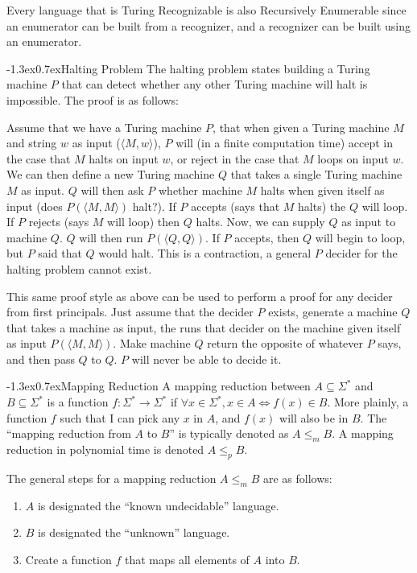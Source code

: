 \documentclass[10pt,landscape]{article}
\makeatletter
\renewcommand{\subsection}{\@startsection{subsection}{2}{0pt}%
                           {-1.3ex}{0.7ex}{\normalfont\normalsize\bfseries}}
\makeatother
\begin{document}
\begin{multicols*}{3}
Every language that is Turing Recognizable is also Recursively Enumerable since
an enumerator can be built from a recognizer, and a recognizer can be built
using an enumerator.

\subsection{Halting Problem}
The halting problem states building a Turing machine $P$ that can detect
whether any other Turing machine will halt is impossible. The proof is as
follows:

Assume that we have a Turing machine $P$, that when given a Turing machine
$M$ and string $w$ as input ($\langle M, w \rangle$), $P$ will (in a finite
computation time) accept in the case that $M$ halts on input 
$w$, or reject in the case that $M$ loops on input $w$. We can then
define a new Turing machine $Q$ that takes a single Turing machine $M$ 
as input. $Q$ will then ask $P$ whether machine $M$ halts when given
itself as input (does $P(\langle M, M \rangle)$ halt?). If $P$ 
accepts (says that $M$ halts) the $Q$ will loop. If $P$ rejects 
(says $M$ will loop) then $Q$ halts. Now, we can supply $Q$ as input
to machine $Q$. $Q$ will then run $P(\langle Q, Q \rangle)$. If $P$
accepts, then $Q$ will begin to loop, but $P$ said that $Q$ would
halt. This is a contraction, a general $P$ decider for the halting problem
cannot exist.

This same proof style as above can be used to perform a proof for any decider
from first principals. Just assume that the decider $P$ exists, generate a
machine $Q$ that takes a machine as input, the runs that decider on
the machine given itself as input $P(\langle M, M\rangle)$. Make machine $Q$
return the opposite of whatever $P$ says, and then pass $Q$ to $Q$. $P$ will
never be able to decide it.

\subsection{Mapping Reduction}
A mapping reduction between $A \subseteq \Sigma^*$ and 
$B \subseteq \Sigma^*$ is a function $f : \Sigma^* \to \Sigma^*$ if
$\forall x \in \Sigma^*, x \in A \Leftrightarrow f(x) \in B$. More plainly,
a function $f$ such that I can pick any $x$ in $A$, and $f(x)$ will also
be in $B$. The ``mapping reduction from $A$ to $B$'' is typically denoted
as $A \leq_m B$. A mapping reduction in polynomial time is denoted
$A \leq_p B$.

The general steps for a mapping reduction $A \leq_m B$ are as follows:
\begin{enumerate}
    \item $A$ is designated the ``known undecidable'' language.
    \item $B$ is designated the ``unknown'' language.
    \item Create a function $f$ that maps all elements of $A$ into $B$.
\end{enumerate}


\end{multicols*}
\end{document}
